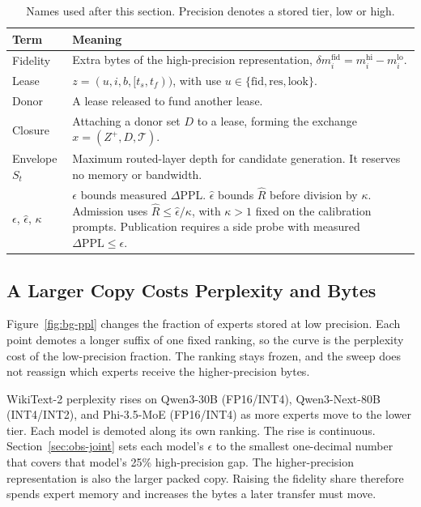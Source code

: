 \begin{table}[t]
  \caption{Names used after this section. Precision denotes a stored tier, low or high.}
  \label{tab:glossary}
  \small
  \setlength{\tabcolsep}{4pt}
  \begin{tabularx}{\columnwidth}{@{}>{\raggedright\arraybackslash}p{}X@{}}
    \toprule
    Term & Meaning \\
    \midrule
    Fidelity & Extra bytes of the high-precision representation, \(\delta m_i^{\mathrm{fid}}=m_i^{\mathrm{hi}}-m_i^{\mathrm{lo}}\). \\
    Lease & \(z=(u,i,b,[t_s,t_f))\), with use \(u\in\{\mathrm{fid},\mathrm{res},\mathrm{look}\}\). \\
    Donor & A lease released to fund another lease. \\
    Closure & Attaching a donor set \(D\) to a lease, forming the exchange \(x=(Z^{+},D,\mathcal{T})\). \\
    Envelope \(S_t\) & Maximum routed-layer depth for candidate generation. It reserves no memory or bandwidth. \\
    \(\epsilon\), \(\widehat\epsilon\), \(\kappa\) & \(\epsilon\) bounds measured \(\Delta\)PPL. \(\widehat\epsilon\) bounds \(\widehat R\) before division by \(\kappa\). Admission uses \(\widehat R\le\widehat\epsilon/\kappa\), with \(\kappa>1\) fixed on the calibration prompts. Publication requires a side probe with measured \(\Delta\mathrm{PPL}\le\epsilon\). \\
    \bottomrule
  \end{tabularx}
\end{table}

\subsection{A Larger Copy Costs Perplexity and Bytes}
\label{sec:obs-quality}

Figure~\ref{fig:bg-ppl} changes the fraction of experts stored at low precision.
Each point demotes a longer suffix of one fixed ranking, so the curve is the perplexity cost of the low-precision fraction.
The ranking stays frozen, and the sweep does not reassign which experts receive the higher-precision bytes.

WikiText-2 perplexity rises on Qwen3-30B (FP16/INT4), Qwen3-Next-80B (INT4/INT2), and Phi-3.5-MoE (FP16/INT4) as more experts move to the lower tier. Each model is demoted along its own ranking.
The rise is continuous. Section~\ref{sec:obs-joint} sets each model's \(\epsilon\) to the smallest one-decimal number that covers that model's 25\% high-precision gap.
The higher-precision representation is also the larger packed copy.
Raising the fidelity share therefore spends expert memory and increases the bytes a later transfer must move.

